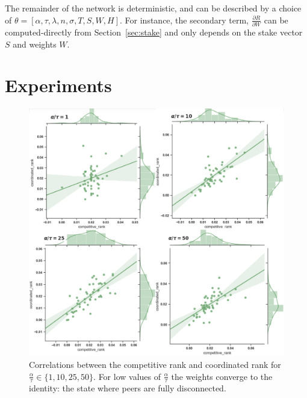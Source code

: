 \documentclass{article}
\begin{document}
The remainder of the network is deterministic, and can be described by a choice of $\theta = [\alpha, \tau, \lambda, n, \sigma, T, S, W, H]$. For instance, the secondary term, $\frac{\partial R}{\partial W}$ can be computed-directly from Section~\ref{sec:stake} and only depends on the stake vector $S$ and weights $W$.

\section{Experiments}
\label{experiments}
\begin{figure}[!htb]
	\centering
	\includegraphics[scale=.3]{images/c_vs_c_nice.png}
	\caption{Correlations between the competitive rank and coordinated rank for $\frac{\alpha}{\tau} \in \{1, 10, 25, 50\}$. For low values of $\frac{\alpha}{\tau}$ the weights converge to the identity: the state where peers are fully disconnected. }
	\label{coordvscomp}
\end{figure}
\end{document}
